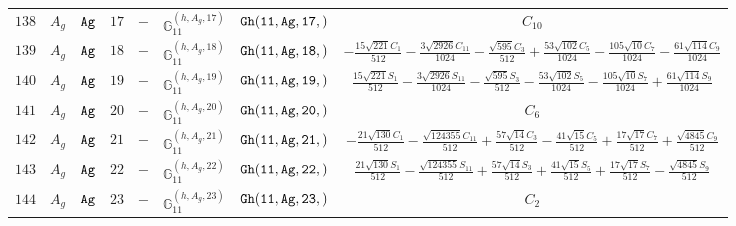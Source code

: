 \documentclass[fleqn,8pt]{jsarticle}
\begin{document}
\begin{table}[ht!]
\begin{center}
\begin{tabular}{cccccccc}
$ 138 $ & $ A_{g} $ & $ {\tt Ag} $ & $ 17 $ & $ - $ & $ \mathbb{G}_{11}^{(h,A_{g},17)} $ & $ {\tt Gh(11,Ag,17,)} $ & $ C_{10} $ \\
$ 139 $ & $ A_{g} $ & $ {\tt Ag} $ & $ 18 $ & $ - $ & $ \mathbb{G}_{11}^{(h,A_{g},18)} $ & $ {\tt Gh(11,Ag,18,)} $ & $ - \frac{15 \sqrt{221} C_{1}}{512} - \frac{3 \sqrt{2926} C_{11}}{1024} - \frac{\sqrt{595} C_{3}}{512} + \frac{53 \sqrt{102} C_{5}}{1024} - \frac{105 \sqrt{10} C_{7}}{1024} - \frac{61 \sqrt{114} C_{9}}{1024} $ \\
$ 140 $ & $ A_{g} $ & $ {\tt Ag} $ & $ 19 $ & $ - $ & $ \mathbb{G}_{11}^{(h,A_{g},19)} $ & $ {\tt Gh(11,Ag,19,)} $ & $ \frac{15 \sqrt{221} S_{1}}{512} - \frac{3 \sqrt{2926} S_{11}}{1024} - \frac{\sqrt{595} S_{3}}{512} - \frac{53 \sqrt{102} S_{5}}{1024} - \frac{105 \sqrt{10} S_{7}}{1024} + \frac{61 \sqrt{114} S_{9}}{1024} $ \\
$ 141 $ & $ A_{g} $ & $ {\tt Ag} $ & $ 20 $ & $ - $ & $ \mathbb{G}_{11}^{(h,A_{g},20)} $ & $ {\tt Gh(11,Ag,20,)} $ & $ C_{6} $ \\
$ 142 $ & $ A_{g} $ & $ {\tt Ag} $ & $ 21 $ & $ - $ & $ \mathbb{G}_{11}^{(h,A_{g},21)} $ & $ {\tt Gh(11,Ag,21,)} $ & $ - \frac{21 \sqrt{130} C_{1}}{512} - \frac{\sqrt{124355} C_{11}}{512} + \frac{57 \sqrt{14} C_{3}}{512} - \frac{41 \sqrt{15} C_{5}}{512} + \frac{17 \sqrt{17} C_{7}}{512} + \frac{\sqrt{4845} C_{9}}{512} $ \\
$ 143 $ & $ A_{g} $ & $ {\tt Ag} $ & $ 22 $ & $ - $ & $ \mathbb{G}_{11}^{(h,A_{g},22)} $ & $ {\tt Gh(11,Ag,22,)} $ & $ \frac{21 \sqrt{130} S_{1}}{512} - \frac{\sqrt{124355} S_{11}}{512} + \frac{57 \sqrt{14} S_{3}}{512} + \frac{41 \sqrt{15} S_{5}}{512} + \frac{17 \sqrt{17} S_{7}}{512} - \frac{\sqrt{4845} S_{9}}{512} $ \\
$ 144 $ & $ A_{g} $ & $ {\tt Ag} $ & $ 23 $ & $ - $ & $ \mathbb{G}_{11}^{(h,A_{g},23)} $ & $ {\tt Gh(11,Ag,23,)} $ & $ C_{2} $ \\
 \hline \hline
\end{tabular}
\end{center}
\end{table}
\end{document}
